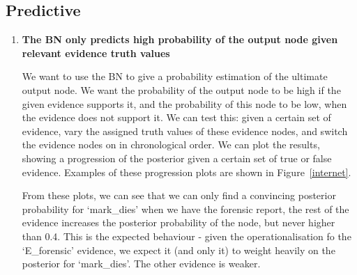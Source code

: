 \subsection{Predictive}
\begin{enumerate}
\item \textbf{The BN only predicts high probability of the output node given relevant evidence truth values}

We want to use the BN to give a probability estimation of the ultimate output node. We want the probability of the output node to be high if the given evidence supports it, and the probability of this node to be low, when the evidence does not support it. We can test this: given a certain set of evidence, vary the assigned truth values of these evidence nodes, and switch the evidence nodes on in chronological order. We can plot the results, showing a progression of the posterior given a certain set of true or false evidence. Examples of these progression plots are shown in Figure~\ref{internet}.

From these plots, we can see that we can only find a convincing posterior probability for `mark\_dies' when we have the forensic report, the rest of the evidence increases the posterior probability of the node, but never higher than 0.4. This is the expected behaviour - given the operationalisation fo the `E\_forensic' evidence, we expect it (and only it) to weight heavily on the posterior for `mark\_dies'. The other evidence is weaker. 


\end{enumerate}
